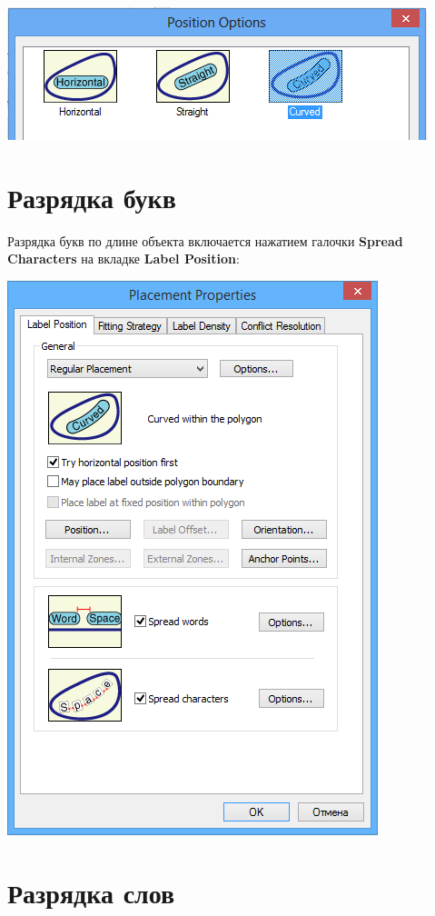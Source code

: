 \documentclass[]{book}
\theoremstyle{definition}
\theoremstyle{definition}
\theoremstyle{definition}
\theoremstyle{remark}
\begin{document}
\includegraphics{images/Appendix/image45.png}

\hypertarget{-}{%
\section{Разрядка букв}\label{-}}

Разрядка букв по длине объекта включается нажатием галочки
\textbf{Spread Characters} на вкладке \textbf{Label Position}:

\includegraphics{images/Appendix/image46.png}

\hypertarget{-}{%
\section{Разрядка слов}\label{-}}
\end{document}
